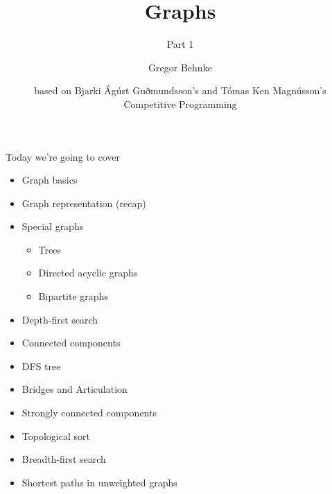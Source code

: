 \documentclass[12pt,t]{beamer}
\title{Graphs}
\subtitle{Part 1}
\author{Gregor Behnke}
\institute{Institute of Artificial Intelligence\\ Ulm University}
\date{\tiny based on Bjarki Ágúst Guðmundsson's and Tómas Ken Magnússon's\\Competitive Programming}
\newcommand{\bi}{\begin{itemize}}
\newcommand{\ei}{\end{itemize}}
\begin{document}
{
    \frame{
        \titlepage
    }
}

\begin{frame}{Today we're going to cover}
    \vspace{10pt}
    \bi
        \item Graph basics
        \item Graph representation (recap)
        \item Special graphs
            \bi
                \item Trees
                \item Directed acyclic graphs
                \item Bipartite graphs
            \ei

        \item Depth-first search
        \item Connected components
        \item DFS tree
        \item Bridges and Articulation
        \item Strongly connected components
        \item Topological sort
        \item Breadth-first search
        \item Shortest paths in unweighted graphs
    \ei
\end{frame}
\end{document}
